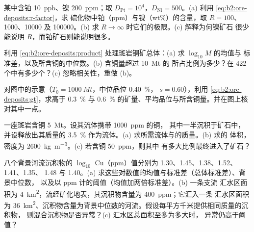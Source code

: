 \begin{exercise}[$\star\star$]\label{exo:b2:ore-deposits:5}
某中含铂 \qty{10}{ppb}、镍 \qty{200}{ppm}；取 $D_{\mathrm{Pt}} =
10^4$，$D_{\mathrm{Ni}} = 500$。(a) 利用 \eqref{eq:b2:ore-deposits:r-factor}，求
硫化物中铂（ppm）与镍（wt\%）的含量，取 $R = 100$、\num{1000}、\num{10000}
及 \num{100000}。(b) 求 $R \to \infty$ 时它们的极限。(c) 解释为何镍矿石
很少能说明 $R$，而铂矿石则能说明很多。
\end{exercise}

\begin{exercise}[$\star\star$]\label{exo:b2:ore-deposits:6}
利用 \eqref{eq:b2:ore-deposits:product} 处理斑岩铜矿总体：(a) 求 $\log_{10} M$ 的均值与
标准差，以及所含铜的中位数。(b) 含铜量超过 \qty{10}{Mt} 的
所占比例为多少？在 422 个中有多少个？(c) 忽略相关性，重做 (b)。
\end{exercise}

\begin{exercise}[$\star\star$]\label{exo:b2:ore-deposits:7}
对图中的示意（$T_0 = \qty{1000}{Mt}$，中位品位 \qty{0.40}{\percent}，
$s = 0.60$），利用 \eqref{eq:b2:ore-deposits:gt}，求高于 \qty{0.3}{\percent} 与
\qty{0.6}{\percent} 的矿量、平均品位与所含铜量。并在图上核对其中一点。
\end{exercise}

\begin{exercise}[$\star\star$]\label{exo:b2:ore-deposits:8}
一座斑岩含铜 \qty{5}{Mt}。设其流体携带 \qty{1000}{ppm} 的铜，
其中一半沉积于矿石中，并设释放出其质量的 \qty{3.5}{\percent}
作为流体。(a) 求所需流体与的质量。(b) 求的
体积，密度为 \qty{2600}{kg.m^{-3}}。(c) 若含铜 \qty{50}{ppm}，则其中
有多大比例最终进入了矿石？
\end{exercise}

\begin{exercise}[$\star\star$]\label{exo:b2:ore-deposits:9}
八个背景河流沉积物的 $\log_{10}$ Cu（ppm）值分别为 1.30、1.45、1.38、1.52、1.41、1.35、
1.48 与 1.40。(a) 求这些对数值的均值与标准差（总体标准差）、背景中位数，
以及以 ppm 计的阈值（均值加两倍标准差）。(b) 一条支流
汇水区面积为 \qty{4}{km^2}，流经矿化地表，其沉积物含量为 \qty{400}{ppm}；它汇入一条
汇水区面积为 \qty{36}{km^2}、沉积物含量为背景中位数的河流。假设每平方千米提供相同质量的沉积物，
则混合沉积物是否异常？(c) 汇水区总面积至多为多大时，
异常仍高于阈值？
\end{exercise}

